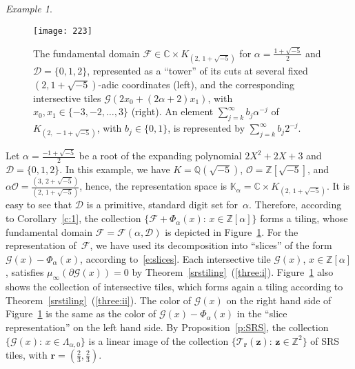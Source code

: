 \documentclass[12pt]{amsart}
\theoremstyle{definition}
\theoremstyle{remark}
\newtheorem{example}[lemma]{Example}
\numberwithin{equation}{section}
\begin{document}
\begin{example}
\begin{figure}[ht]
\texttt{[image: 223]}
\caption{The fundamental domain $\mathcal{F} \in \mathbb{C} \times K_{(2,\, 1+\sqrt{-5})}$ for $\alpha = \frac{1+\sqrt{-5}}{2}$ and $\mathcal{D} = \{0,1,2\}$, represented as a ``tower'' of its cuts at several fixed $(2,1+\sqrt{-5})$-adic coordinates (left), and the corresponding intersective tiles $\mathcal{G}(2x_0 + (2\alpha+2) x_1)$, with $x_0, x_1 \in \{-3,-2,\ldots,3\}$ (right).
An element $\sum_{j=k}^\infty b_j \alpha^{-j}$ of $K_{(2,\, -1+\sqrt{-5})}$, with $b_j \in \{0,1\}$, is represented by $\sum_{j=k}^\infty b_j 2^{-j}$.} \label{fig:223}
\end{figure}
Let $\alpha = \frac{-1+\sqrt{-5}}{2}$ be a root of the expanding polynomial $2X^2 + 2X + 3$ and $\mathcal{D} = \{0,1,2\}$.
In this example, we have $K = \mathbb{Q}(\sqrt{-5})$, $\mathcal{O} = \mathbb{Z}[\sqrt{-5}]$, and $\alpha \mathcal{O} = \frac{(3,\,2+\sqrt{-5})}{(2,\,1+\sqrt{-5})}$, hence, the representation space is $\mathbb{K}_\alpha = \mathbb{C} \times K_{(2,\,1+\sqrt{-5})}$.
It is easy to see that $\mathcal{D}$ is a primitive, standard digit set for~$\alpha$.
Therefore, according to Corollary~\ref{c:1}, the collection $\{\mathcal{F} + \Phi_\alpha(x):\, x \in \mathbb{Z}[\alpha]\}$ forms a tiling, whose fundamental domain $\mathcal{F} = \mathcal{F}(\alpha, \mathcal{D})$ is depicted in Figure~\ref{fig:223}.
For the representation of~$\mathcal{F}$, we have used its decomposition into ``slices'' of the form $\mathcal{G}(x) - \Phi_\alpha(x)$, according to~\eqref{e:slices}. Each intersective tile $\mathcal{G}(x)$, $x\in\mathbb{Z}[\alpha]$, satisfies $\mu_\infty(\partial \mathcal{G}(x))=0$ by Theorem~\ref{srstiling}~(\ref{three:i}). Figure~\ref{fig:223} also shows the collection of intersective tiles, which forms again a tiling according to Theorem~\ref{srstiling}~(\ref{three:ii}).
The color of $\mathcal{G}(x)$ on the right hand side of Figure~\ref{fig:223} is the same as the color of $\mathcal{G}(x) - \Phi_\alpha(x)$ in the ``slice representation'' on the left hand side.
By Proposition~\ref{p:SRS}, the collection $\{\mathcal{G}(x):\, x \in \Lambda_{\alpha,0}\}$ is a linear image of the collection $\{\mathcal{T}_\mathbf{r}(\mathbf{z}):\, \mathbf{z} \in \mathbb{Z}^2\}$ of SRS tiles, with $\mathbf{r} = (\frac{2}{3}, \frac{2}{3})$.


\end{example}
\end{document}
